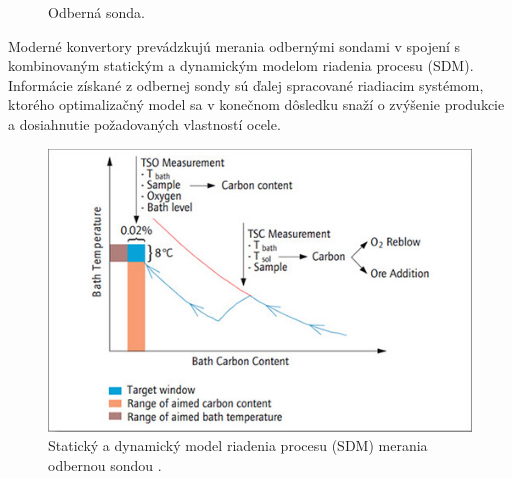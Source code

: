 \documentclass[]{tukediphc}
\begin{document}
\begin{figure}[!ht]
	\centering
	\qquad
	\caption{Odberná sonda.}
\end{figure}

Moderné konvertory prevádzkujú merania odbernými sondami v spojení s kombinovaným statickým a dynamickým modelom riadenia procesu (SDM). Informácie získané z odbernej sondy sú ďalej spracované riadiacim systémom, ktorého optimalizačný model sa v konečnom dôsledku snaží o zvýšenie produkcie a dosiahnutie požadovaných vlastností ocele.

\begin{figure}[h!]
	\centering
	\includegraphics[width=.8\textwidth,angle=0]{figures/sublance-model.jpg}
	\caption{Statický a dynamický model riadenia procesu (SDM) merania odbernou sondou \citep{totalmateria}.}
\end{figure}
\end{document}
